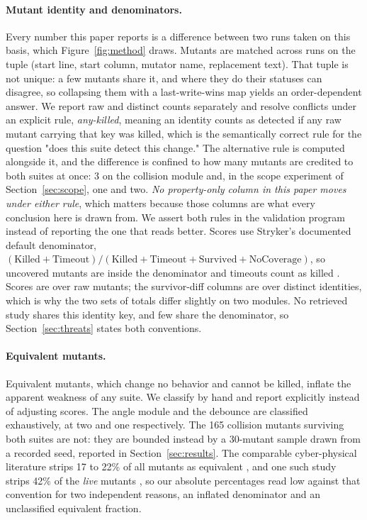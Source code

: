 \documentclass[12pt]{article}
\begin{document}
\paragraph{Mutant identity and denominators.} Every number this paper reports is
a difference between two runs taken on this basis, which
Figure~\ref{fig:method} draws. Mutants are matched across runs on
the tuple (start line, start column, mutator name, replacement text). That tuple
is not unique: a few mutants share it, and where they do their statuses can
disagree, so collapsing them with a last-write-wins map yields an order-dependent
answer. We report raw and distinct counts separately and resolve conflicts under
an explicit rule, \emph{any-killed}, meaning an identity counts as detected if
any raw mutant carrying that key was killed, which is the semantically correct
rule for the question "does this suite detect this change." The alternative rule
is computed alongside it, and the difference is confined to how many mutants are
credited to both suites at once: 3 on the collision module and, in the scope
experiment of Section~\ref{sec:scope}, one and two. \emph{No property-only column
in this paper moves under either rule}, which matters because those columns are
what every conclusion here is drawn from. We assert both rules in the validation program instead of reporting the one that reads better. Scores use Stryker's documented default denominator,
$(\mathrm{Killed}+\mathrm{Timeout})/(\mathrm{Killed}+\mathrm{Timeout}+\mathrm{Survived}+\mathrm{NoCoverage})$,
so uncovered mutants are inside the denominator and timeouts count as killed
\cite{strykerdocs}. Scores are over raw mutants; the survivor-diff columns are
over distinct identities, which is why the two sets of totals differ slightly on
two modules. No retrieved study shares this identity key, and few share the
denominator, so Section~\ref{sec:threats} states both conventions.

\paragraph{Equivalent mutants.} Equivalent mutants, which change no behavior and
cannot be killed, inflate the apparent weakness of any suite. We classify by hand and report explicitly instead of adjusting scores. The angle module and the
debounce are classified exhaustively, at two and one respectively. The 165
collision mutants surviving both suites are not: they are bounded instead by a
30-mutant sample drawn from a recorded seed, reported in
Section~\ref{sec:results}. The comparable cyber-physical literature strips 17 to
22\% of all mutants as equivalent \cite{bartocci2023}, and one such study strips
42\% of the \emph{live} mutants \cite{cornejo2022}, so our absolute percentages read low against
that convention for two independent reasons, an inflated denominator and an
unclassified equivalent fraction.
\end{document}
